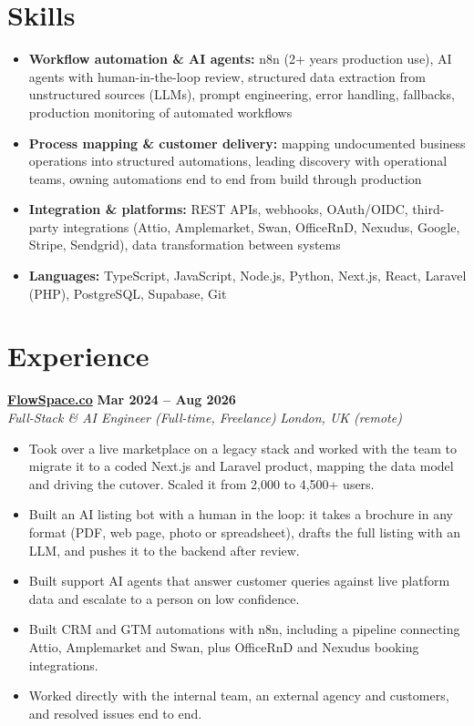 \documentclass[a4paper,10pt]{article}
\newcommand{\role}[4]{%
 \textbf{#1} \hfill \textbf{#2}\\[1pt]%
 \textit{#3} \hfill \textit{#4}\\[2pt]%
}
\begin{document}
\section{Skills}
\begin{itemize}
 \item \textbf{Workflow automation \& AI agents:} n8n (2+ years production use), AI agents with human-in-the-loop review, structured data extraction from unstructured sources (LLMs), prompt engineering, error handling, fallbacks, production monitoring of automated workflows
 \item \textbf{Process mapping \& customer delivery:} mapping undocumented business operations into structured automations, leading discovery with operational teams, owning automations end to end from build through production
 \item \textbf{Integration \& platforms:} REST APIs, webhooks, OAuth/OIDC, third-party integrations (Attio, Amplemarket, Swan, OfficeRnD, Nexudus, Google, Stripe, Sendgrid), data transformation between systems
 \item \textbf{Languages:} TypeScript, JavaScript, Node.js, Python, Next.js, React, Laravel (PHP), PostgreSQL, Supabase, Git
\end{itemize}

\section{Experience}

\role{\href{https://flowspace.co}{FlowSpace.co}}{Mar 2024 -- Aug 2026}{Full-Stack \& AI Engineer (Full-time, Freelance)}{London, UK (remote)}
\begin{itemize}
 \item Took over a live marketplace on a legacy stack and worked with the team to migrate it to a coded Next.js and Laravel product, mapping the data model and driving the cutover. Scaled it from 2,000 to 4,500+ users.
 \item Built an AI listing bot with a human in the loop: it takes a brochure in any format (PDF, web page, photo or spreadsheet), drafts the full listing with an LLM, and pushes it to the backend after review.
 \item Built support AI agents that answer customer queries against live platform data and escalate to a person on low confidence.
 \item Built CRM and GTM automations with n8n, including a pipeline connecting Attio, Amplemarket and Swan, plus OfficeRnD and Nexudus booking integrations.
 \item Worked directly with the internal team, an external agency and customers, and resolved issues end to end.
\end{itemize}
\end{document}
